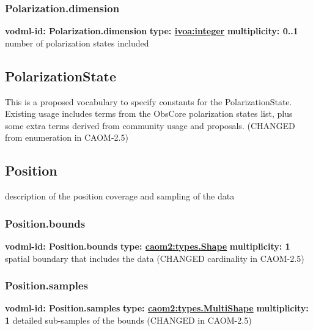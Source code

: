     \subsubsection{Polarization.dimension}
      \textbf{vodml-id: Polarization.dimension} \newline
      \textbf{type: \hyperref[sect:ivoa]{ivoa:integer}} \newline
      \textbf{multiplicity: 0..1} \newline
      number of polarization states included

  \subsection{PolarizationState}
  \label{sect:PolarizationState}
    This is a proposed vocabulary to specify constants for the PolarizationState. Existing usage includes terms from the ObsCore polarization states list, plus some extra terms derived from community usage and proposals. (CHANGED from enumeration in CAOM-2.5)

  \subsection{Position}
  \label{sect:Position}
    description of the position coverage and sampling of the data

    \subsubsection{Position.bounds}
      \textbf{vodml-id: Position.bounds} \newline
      \textbf{type: \hyperref[sect:types.Shape]{caom2:types.Shape}} \newline
      \textbf{multiplicity: 1} \newline
      spatial boundary that includes the data (CHANGED cardinality in CAOM-2.5)

    \subsubsection{Position.samples}
      \textbf{vodml-id: Position.samples} \newline
      \textbf{type: \hyperref[sect:types.MultiShape]{caom2:types.MultiShape}} \newline
      \textbf{multiplicity: 1} \newline
      detailed sub-samples of the bounds (CHANGED in CAOM-2.5)

